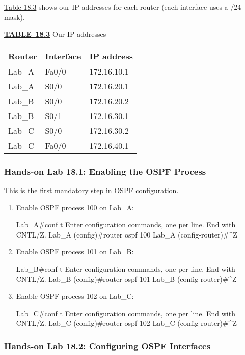 \protect\hyperlink{c18.xhtmlux5cux23table18-3}{Table 18.3} shows our IP
addresses for each router (each interface uses a /24 mask).

{\protect\hyperlink{c18.xhtmlux5cux23tableanchor18-3}{\textbf{TABLE~18.3}}
Our IP addresses}

\begin{longtable}[]{@{}lll@{}}
\toprule
Router & Interface & IP address\tabularnewline
\midrule
\endhead
Lab\_A & Fa0/0 & 172.16.10.1\tabularnewline
Lab\_A & S0/0 & 172.16.20.1\tabularnewline
Lab\_B & S0/0 & 172.16.20.2\tabularnewline
Lab\_B & S0/1 & 172.16.30.1\tabularnewline
Lab\_C & S0/0 & 172.16.30.2\tabularnewline
Lab\_C & Fa0/0 & 172.16.40.1\tabularnewline
\bottomrule
\end{longtable}

\subsubsection[Hands-on Lab 18.1: Enabling the OSPF
Process]{\texorpdfstring{\protect\hypertarget{c18.xhtmlux5cux23c18-sec-21}{}{}Hands-on
Lab 18.1: Enabling the OSPF
Process}{Hands-on Lab 18.1: Enabling the OSPF Process}}

This is the first mandatory step in OSPF configuration.

\begin{enumerate}
\item
  Enable OSPF process 100 on Lab\_A:

\begin{cli}
Lab_A#conf t
Enter configuration commands, one per line.
  End with CNTL/Z.
Lab_A (config)#router ospf 100
Lab_A (config-router)#^Z
\end{cli}
\item
  Enable OSPF process 101 on Lab\_B:

\begin{cli}
Lab_B#conf t
Enter configuration commands, one per line.
  End with CNTL/Z.
Lab_B (config)#router ospf 101
Lab_B (config-router)#^Z
\end{cli}
\item
  Enable OSPF process 102 on Lab\_C:

\begin{cli}
Lab_C#conf t
Enter configuration commands, one per line.
  End with CNTL/Z.
Lab_C (config)#router ospf 102
Lab_C (config-router)#^Z
\end{cli}
\end{enumerate}

\subsubsection[Hands-on Lab 18.2: Configuring OSPF
Interfaces]{\texorpdfstring{\protect\hypertarget{c18.xhtmlux5cux23c18-sec-22}{}{}Hands-on
Lab 18.2: Configuring OSPF
Interfaces}{Hands-on Lab 18.2: Configuring OSPF Interfaces}}

